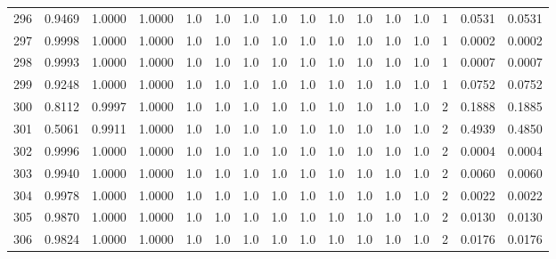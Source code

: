 \begin{tabular}{lrrrrrrrrrrrrrrr}
296 &      0.9469 &  1.0000 &  1.0000 &     1.0 &     1.0 &     1.0 &     1.0 &     1.0 &     1.0 &     1.0 &      1.0 &        1.0 &      1 &                    0.0531 &                     0.0531 \\
297 &      0.9998 &  1.0000 &  1.0000 &     1.0 &     1.0 &     1.0 &     1.0 &     1.0 &     1.0 &     1.0 &      1.0 &        1.0 &      1 &                    0.0002 &                     0.0002 \\
298 &      0.9993 &  1.0000 &  1.0000 &     1.0 &     1.0 &     1.0 &     1.0 &     1.0 &     1.0 &     1.0 &      1.0 &        1.0 &      1 &                    0.0007 &                     0.0007 \\
299 &      0.9248 &  1.0000 &  1.0000 &     1.0 &     1.0 &     1.0 &     1.0 &     1.0 &     1.0 &     1.0 &      1.0 &        1.0 &      1 &                    0.0752 &                     0.0752 \\
300 &      0.8112 &  0.9997 &  1.0000 &     1.0 &     1.0 &     1.0 &     1.0 &     1.0 &     1.0 &     1.0 &      1.0 &        1.0 &      2 &                    0.1888 &                     0.1885 \\
301 &      0.5061 &  0.9911 &  1.0000 &     1.0 &     1.0 &     1.0 &     1.0 &     1.0 &     1.0 &     1.0 &      1.0 &        1.0 &      2 &                    0.4939 &                     0.4850 \\
302 &      0.9996 &  1.0000 &  1.0000 &     1.0 &     1.0 &     1.0 &     1.0 &     1.0 &     1.0 &     1.0 &      1.0 &        1.0 &      2 &                    0.0004 &                     0.0004 \\
303 &      0.9940 &  1.0000 &  1.0000 &     1.0 &     1.0 &     1.0 &     1.0 &     1.0 &     1.0 &     1.0 &      1.0 &        1.0 &      2 &                    0.0060 &                     0.0060 \\
304 &      0.9978 &  1.0000 &  1.0000 &     1.0 &     1.0 &     1.0 &     1.0 &     1.0 &     1.0 &     1.0 &      1.0 &        1.0 &      2 &                    0.0022 &                     0.0022 \\
305 &      0.9870 &  1.0000 &  1.0000 &     1.0 &     1.0 &     1.0 &     1.0 &     1.0 &     1.0 &     1.0 &      1.0 &        1.0 &      2 &                    0.0130 &                     0.0130 \\
306 &      0.9824 &  1.0000 &  1.0000 &     1.0 &     1.0 &     1.0 &     1.0 &     1.0 &     1.0 &     1.0 &      1.0 &        1.0 &      2 &                    0.0176 &                     0.0176 \\

\end{tabular}
